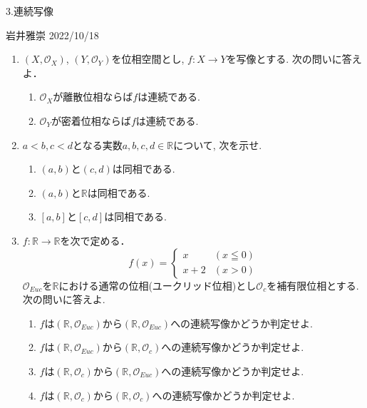 \documentclass[dvipdfmx,a4paper,11pt]{article}
\newcommand{\R}{\mathbb{R}}
\theoremstyle{definition}
\begin{document}


\begin{center}
{\Large 3.連続写像}
\end{center}

\begin{flushright}
 岩井雅崇 2022/10/18
\end{flushright}

\begin{enumerate}[ label=\textbf{問}3.\arabic*]

\item $(X, \mathscr{O}_X )$, $(Y, \mathscr{O}_Y)$を位相空間とし, $f : X \rightarrow Y$を写像とする. 次の問いに答えよ．
	\begin{enumerate}
	\item $\mathscr{O}_X $が離散位相ならば$f$は連続である.
	\item $\mathscr{O}_Y $が密着位相ならば$f$は連続である.
	\end{enumerate}

\item $a<b, c<d$となる実数$a,b,c,d \in \R$について, 次を示せ.
 	\begin{enumerate}
	\item $(a,b)$と$(c,d)$は同相である.  
	\item $(a,b)$と$\R$は同相である. 
	\item $[a,b]$と$[c,d]$は同相である. 
	\end{enumerate}	
	
\item $f : \R \rightarrow \R$を次で定める．
   $$
  f(x)= \begin{cases}
     x& (x \leqq 0) \\
    x+2& (x >0)
  \end{cases}
  $$
  $\mathscr{O}_{Euc}$を$\R$における通常の位相(ユークリッド位相)とし$\mathscr{O}_c$を補有限位相とする. 次の問いに答えよ.
 	\begin{enumerate}
	\item $f $は$(\R, \mathscr{O}_{Euc})$から$(\R, \mathscr{O}_{Euc})$への連続写像かどうか判定せよ.
	\item $f $は$(\R, \mathscr{O}_{Euc})$から$(\R, \mathscr{O}_c)$への連続写像かどうか判定せよ.
	\item $f $は$(\R, \mathscr{O}_c)$から$(\R, \mathscr{O}_{Euc})$への連続写像かどうか判定せよ.
	\item $f $は$(\R, \mathscr{O}_c)$から$(\R, \mathscr{O}_c)$への連続写像かどうか判定せよ.
	\end{enumerate}


\end{enumerate}
\end{document}
